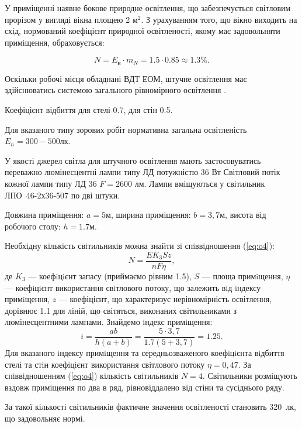\documentclass{thesis_utf8}
\begin{document}
У приміщенні наявне бокове природне освітлення, що забезпечується світловим прорізом у вигляді вікна площею 2 м$^2$.
З урахуванням того, що вікно виходить на схід, нормований коефіцієнт природної освітленості, якому має задовольняти приміщення, обраховується:

\begin{equation}
    N = E_{н} \cdot m_N = 1.5 \cdot 0.85 \approx 1.3 \%.
\end{equation}

Оскільки робочі місця обладнані ВДТ ЕОМ, штучне освітлення має здійснюватись системою загального рівномірного освітлення \cite{OOP3}.

Коефіцієнт відбиття для стелі 0.7, для стін 0.5.

Для вказаного типу зорових робіт нормативна загальна освітленість $E_{n} = 300-500$лк.

У якості джерел світла для штучного освітлення мають застосовуватись переважно люмінесцентні лампи типу ЛД потужністю 36 Вт
Світловий потік кожної лампи типу ЛД 36 $F = 2600$ лм. Лампи вміщуються у світильник ЛПО~46-2х36-507 по дві штуки.

Довжина приміщення: $a = 5$м, ширина приміщення: $b = 3,7$м, висота від робочого столу: $h = 1.7$м.

Необхiдну кiлькiсть свiтильникiв можна знайти зi спiввiдношення (\ref{eq:o4}):
\begin{equation}
    N = \frac{E K_{\textit{3}} S z}{n F \eta},
    \label{eq:o4}
\end{equation}
де $K_{\textit{3}}$ --- коефiцiєнт запасу (приймаємо рівним 1.5),
$S$ --- площа примiщення,
$\eta$ --- коефiцiєнт використання свiтлового потоку, що залежить вiд
iндексу примiщення,
$z$ --- коефіцієнт, що характеризує нерівномірність освітлення, дорівнює 1.1 для ліній, що світяться, виконаних світильниками з люмінесцентними лампами.
Знайдемо iндекс примiщення:
\begin{equation}
    i = \frac{ab}{h(a+b)} = \frac{5 \cdot 3,7}{1.7(5 + 3,7)} = 1.25.
\end{equation}
Для вказаного iндексу примiщення та середньозваженого коефiцiєнта вiдбиття стелi та стiн коефiцiєнт використання свiтлового потоку $\eta = 0,47$.
За спiввiдношенням (\ref{eq:o4}) кiлькiсть свiтильникiв $N=4$. Світильники розміщують вздовж приміщення по два в ряд, рівновіддалено від стіни та сусіднього ряду.

За такої кількості світильників фактичне значення освітленості становить 320~лк, що задовольняє нормі.
\end{document}
